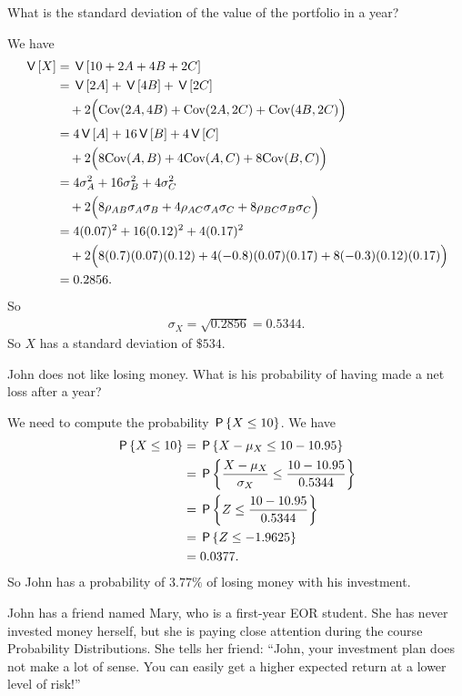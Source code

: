 \documentclass[lectures]{subfiles}
\begin{document}
\begin{exercise}
What is the standard deviation of the value of the portfolio in a year?
\begin{solution}
We have
\begin{align}
    \V{X} &= \V{ 10 + 2A + 4B + 2C} \\
    &= \V{2A} + \V{4B} + \V{2C} \\
    &\quad +2\Big( \covv(2A, 4B) + \covv(2A, 2C) + \covv(4B, 2C) \Big) \\
    &= 4\V{A} + 16\V{B} + 4\V{C}\\
    &\quad +2\Big( 8\covv(A, B) + 4\covv(A, C) + 8\covv(B, C) \Big) \\
    &= 4\sigma_A^2 + 16\sigma_B^2 + 4\sigma_C^2 \\
    &\quad +2\Big( 8\rho_{AB}\sigma_A \sigma_B + 4\rho_{AC}\sigma_A \sigma_C + 8\rho_{BC}\sigma_B \sigma_C \Big) \\
    &= 4(0.07)^2 + 16(0.12)^2 + 4(0.17)^2 \\
    &\quad +2\Big( 8(0.7)(0.07) (0.12) + 4(-0.8)(0.07)(0.17) + 8(-0.3)(0.12) (0.17)\Big) \\
    &= 0.2856.
\end{align}
So
\begin{align}
    \sigma_X = \sqrt{0.2856} = 0.5344.
\end{align}
So $X$ has a standard deviation of $\$534$.
\end{solution}
\end{exercise}

\begin{exercise}
John does not like losing money. What is his probability of having made a net loss after a year?
\begin{solution}
We need to compute the probability $\P{X \leq 10}$. We have
\begin{align}
    \P{X \leq 10}
 &= \P{ X - \mu_X \leq 10 - 10.95} \\
    &= \P{ \frac{X - \mu_X}{\sigma_X} \leq \frac{10 - 10.95}{0.5344} } \\
    &= \P{ Z \leq \frac{10 - 10.95}{0.5344} } \\
    &= \P{ Z \leq -1.9625 } \\
    &= 0.0377.
\end{align}
So John has a probability of $3.77\%$ of losing money with his investment.
\end{solution}
\end{exercise}

John has a friend named Mary, who is a first-year EOR student. She has never invested money herself, but she is paying close attention during the course Probability Distributions. She tells her friend: ``John, your investment plan does not make a lot of sense. You can easily get a higher expected return at a lower level of risk!''
\end{document}
